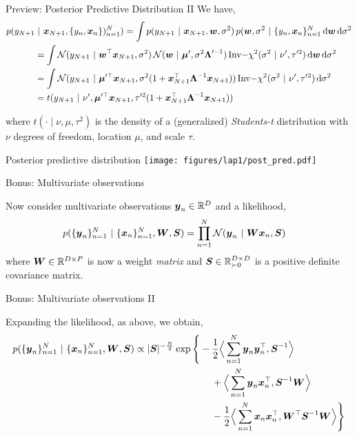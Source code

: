 \documentclass[aspectratio=169]{beamer}
\begin{document}
\begin{frame}{Preview: Posterior Predictive Distribution II}
We have,
\begin{align}
    p(y_{N+1} &~\vert~ \boldsymbol{x}_{N+1}, \{y_n, \boldsymbol{x}_n\})_{n=1}^N)
    = \int p(y_{N+1} ~\vert~ \boldsymbol{x}_{N+1}, \boldsymbol{w}, \sigma^2) \, p(\boldsymbol{w}, \sigma^2 ~\vert~ \{y_{n}, \boldsymbol{x}_n\}_{n=1}^N \mathop{}\!\mathrm{d} \boldsymbol{w} \mathop{}\!\mathrm{d} \sigma^2 \\
    &= 
    \int \mathcal{N}(y_{N+1} ~\vert~ \boldsymbol{w}^\top \boldsymbol{x}_{N+1}, \sigma^2) \, \mathcal{N}(\boldsymbol{w} ~\vert~ \boldsymbol{\mu}', \sigma^2 \boldsymbol{\Lambda}'^{-1}) \, \mathrm{Inv-}\chi^2(\sigma^2 ~\vert~ \nu', \tau'^2) \mathop{}\!\mathrm{d} \boldsymbol{w} \mathop{}\!\mathrm{d} \sigma^2 \\
    &= 
    \int \mathcal{N}(y_{N+1} ~\vert~ \boldsymbol{\mu}'^\top \boldsymbol{x}_{N+1}, \sigma^2 ( 1 + \boldsymbol{x}_{N+1}^\top \boldsymbol{\Lambda}^{-1} \boldsymbol{x}_{N+1})) \,  \mathrm{Inv-}\chi^2(\sigma^2 ~\vert~ \nu', \tau'^2) \mathop{}\!\mathrm{d} \sigma^2 \\
    &= t(y_{N+1} ~\vert~ \nu', \boldsymbol{\mu}'^\top \boldsymbol{x}_{N+1}, \tau'^2 ( 1 + \boldsymbol{x}_{N+1}^\top \boldsymbol{\Lambda}^{-1} \boldsymbol{x}_{N+1})) 
\end{align}

where $t(\cdot \mid \nu, \mu, \tau^2)$ is the density of a (generalized) \emph{Students-t} distribution with $\nu$ degrees of freedom, location $\mu$, and scale $\tau$.
\end{frame}

\begin{frame}{Posterior predictive distribution}
\centering
\texttt{[image: figures/lap1/post\_pred.pdf]}
\end{frame}

\begin{frame}{Bonus: Multivariate observations}

Now consider multivariate observations $\boldsymbol{y}_n \in \mathbb{R}^D$ and a likelihood,
\begin{align}
    p(\{\boldsymbol{y}_n\}_{n=1}^N ~\vert~ \{\boldsymbol{x}_n\}_{n=1}^N, \boldsymbol{W}, \boldsymbol{S}) 
    &= \prod_{n=1}^N \mathcal{N}(\boldsymbol{y}_n ~\vert~ \boldsymbol{W} \boldsymbol{x}_n, \boldsymbol{S}) 
\end{align}
where $\boldsymbol{W} \in \mathbb{R}^{D \times P}$ is now a weight \textit{matrix} and $\boldsymbol{S} \in \mathbb{R}_{\succ 0}^{D \times D}$ is a positive definite covariance matrix. 
\end{frame}

\begin{frame}{Bonus: Multivariate observations II}

Expanding the likelihood, as above, we obtain,
\begin{align}
\nonumber
p(\{\boldsymbol{y}_n\}_{n=1}^N ~\vert~ \{\boldsymbol{x}_n\}_{n=1}^N, \boldsymbol{W}, \boldsymbol{S}) 
    &\propto |\boldsymbol{S}|^{-\frac{N}{2}} \exp \Bigg\{ 
    -\frac{1}{2} \Big \langle \sum_{n=1}^N \boldsymbol{y}_n \boldsymbol{y}_n^\top, \boldsymbol{S}^{-1} \Big \rangle \\
    \nonumber
    &\hspace{8em}
    + \Big \langle \sum_{n=1}^N \boldsymbol{y}_n \boldsymbol{x}_n^\top, \boldsymbol{S}^{-1} \boldsymbol{W} \Big \rangle 
    \\
    &\hspace{8em}
    - \frac{1}{2} \Big \langle \sum_{n=1}^N \boldsymbol{x}_n \boldsymbol{x}_n^\top, \boldsymbol{W}^\top \boldsymbol{S}^{-1} \boldsymbol{W} \Big \rangle  \Bigg \}
\end{align}

\end{frame}
\end{document}
